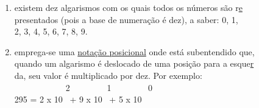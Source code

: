 \documentclass[a4paper,12pt]{article}
\begin{document}
\begin{enumerate}[label=\alph*), align=left, leftmargin=1.5em, labelsep=-0.5em, itemsep=1em, topsep=1.5em]
\item existem dez algarismos com os quais todos os números são r\uline e\\
presentados (pois a base de numeração é dez), a saber: 0, 1,\\
2, 3, 4, 5, 6, 7, 8, 9.
\item emprega-se uma \uline{notação posicional} onde está subentendido que,\\
quando um algarismo é deslocado de uma posição para a esque\uline r\\
da, seu valor é multiplicado por dez. Por exemplo:\\[-0.5em]
\phantom \ \ \ \ \ \ \ \ \ \ \ \ 2 \ \ \ \ \ \ \ \ 1 \ \ \ \ \ \ \ \ 0\\[-1em]
295 = 2 x 10 \ + 9 x 10 \ + 5 x 10\\[-1.5em]
\end{enumerate}
\end{document}
